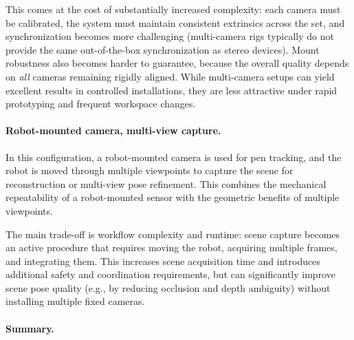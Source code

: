 This comes at the cost of substantially increased complexity: each camera must be calibrated, the system must maintain consistent extrinsics across the set, and synchronization becomes more challenging (multi-camera rigs typically do not provide the same out-of-the-box synchronization as stereo devices). Mount robustness also becomes harder to guarantee, because the overall quality depends on \emph{all} cameras remaining rigidly aligned. While multi-camera setups can yield excellent results in controlled installations, they are less attractive under rapid prototyping and frequent workspace changes.

\paragraph{Robot-mounted camera, multi-view capture.}
In this configuration, a robot-mounted camera is used for pen tracking, and the robot is moved through multiple viewpoints to capture the scene for reconstruction or multi-view pose refinement. This combines the mechanical repeatability of a robot-mounted sensor with the geometric benefits of multiple viewpoints.

The main trade-off is workflow complexity and runtime: scene capture becomes an active procedure that requires moving the robot, acquiring multiple frames, and integrating them. This increases scene acquisition time and introduces additional safety and coordination requirements, but can significantly improve scene pose quality (e.g., by reducing occlusion and depth ambiguity) without installing multiple fixed cameras.

\paragraph{Summary.}

